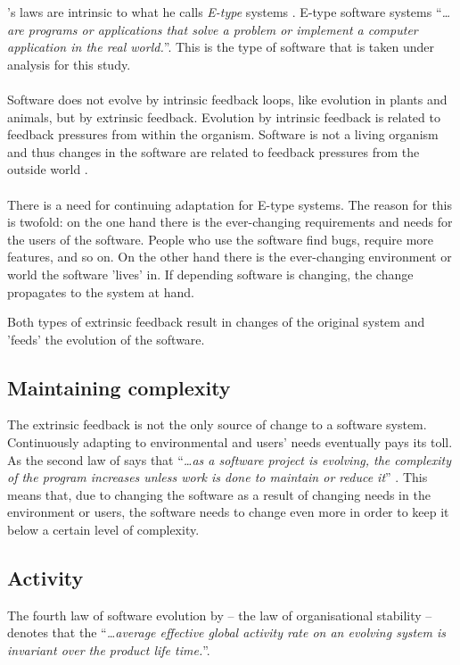 \citeauthor{lehman}'s laws are intrinsic to what he calls \textit{E-type}
systems \cite{lehman80}. E-type software systems ``\textit{\dots{}are programs
or applications that solve a problem or implement a computer application in the real
world.}''\cite{lehman}. This is the type of software that is taken under
analysis for this study.

\paragraph{}
Software does not evolve by intrinsic feedback loops, like evolution in plants
and animals, but by extrinsic feedback. Evolution by intrinsic feedback is
related to feedback pressures from within the organism. Software is not a
living organism and thus changes in the software are related to feedback
pressures from the outside world \cite{lehman}.

\paragraph{}
There is a need for continuing adaptation for E-type systems. The reason for
this is twofold: on the one hand there is the ever-changing requirements
and needs for the users of the software. People who use the software find bugs,
require more features, and so on. On the other hand there is the ever-changing
environment or world the software 'lives' in. If depending software is
changing, the change propagates to the system at hand.

Both types of extrinsic feedback result in changes of the original system and
'feeds' the evolution of the software.

\subsection{Maintaining complexity}
The extrinsic feedback is not the only source of change to a software system.
Continuously adapting to environmental and users' needs eventually pays its
toll. As the second law of \citeauthor{lehman} says that ``\textit{\dots{}as a
software project is evolving, the complexity of the program increases unless
work is done to maintain or reduce it}'' \cite{lehman}. This means that, due
to changing the software as a result of changing needs in the environment or
users, the software needs to change even more in order to keep it below a
certain level of complexity.

\subsection{Activity}
The fourth law of software evolution by \citet{lehman} -- the law of
organisational stability -- denotes that the ``\textit{\dots{}average effective
global activity rate on an evolving system is invariant over the product life
time.}''.

